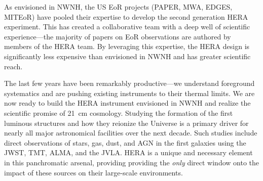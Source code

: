 \documentclass[preprint]{aastex}
\begin{document}
As envisioned in NWNH, the US EoR projects (PAPER, MWA, EDGES, MITEoR) have
pooled their expertise to develop the second generation HERA experiment. This
has created a collaborative team with a deep well of scientific
experience---the majority of papers on EoR observations are authored by members
of the HERA team. By leveraging this expertise, the HERA design is significantly
less expensive than envisioned in 
NWNH and has greater scientific reach.

The last few years have been remarkably productive---we
understand foreground systematics and are pushing 
existing
instruments to their thermal limits. We are now ready to build the HERA
instrument envisioned in NWNH and realize the scientific promise of 21~cm
cosmology.
Studying the formation of the first luminous structures 
and how they reionize the Universe is a primary driver for 
nearly all major astronomical facilities over the next decade.
Such studies include direct 
observations of stars, gas, dust, and AGN in the
first galaxies using the JWST, TMT, ALMA, and the JVLA. HERA is 
a unique and necessary element in this panchromatic arsenal, providing
providing the \emph{only} direct window onto the impact of these sources on 
their large-scale environments.


\clearpage
\setcounter{page}{1}
\thispagestyle{empty}
%
%


\end{document}
